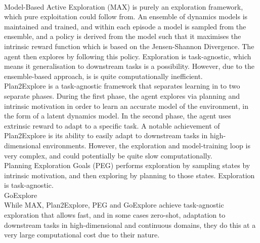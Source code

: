 \\ Model-Based Active Exploration (MAX) \cite{DBLP:journals/corr/abs-1810-12162} is purely an exploration framework, which pure exploitation could follow from. An ensemble of dynamics models is maintained and trained, and within each episode a model is sampled from the ensemble, and a policy is derived from the model such that it maximises the intrinsic reward function which is based on the Jensen-Shannon Divergence. The agent then explores by following this policy. Exploration is task-agnostic, which means it generalisation to downstream tasks is a possibility. However, due to the ensemble-based approach, is is quite computationally inefficient.
\\ Plan2Explore \cite{plan2explore} is a task-agnostic framework that separates learning in to two separate phases. During the first phase, the agent explores via planning and intrinsic motivation in order to learn an accurate model of the environment, in the form of a latent dynamics model. In the second phase, the agent uses extrinsic reward to adapt to a specific task. A notable achievement of Plan2Explore is its ability to easily adapt to downstream tasks in high-dimensional environments. However, the exploration and model-training loop is very complex, and could potentially be quite slow computationally.
\\Planning Exploration Goals (PEG) \cite{hu2023planning} performs exploration by sampling states by intrinsic motivation, and then exploring by planning to those states. Exploration is task-agnostic.
\\ GoExplore \cite{goexplore}
\\While MAX, Plan2Explore, PEG and GoExplore achieve task-agnostic exploration that allows fast, and in some cases zero-shot, adaptation to downstream tasks in high-dimensional and continuous domains, they do this at a very large computational cost due to their nature.
